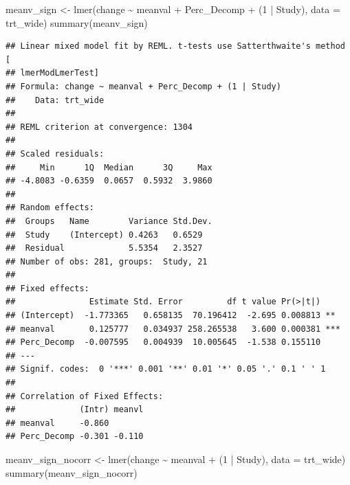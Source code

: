 \documentclass[
]{article}
\newenvironment{Shaded}{\begin{snugshade}}{\end{snugshade}}
\newcommand{\AttributeTok}[1]{\textcolor[rgb]{0.77,0.63,0.00}{#1}}
\newcommand{\DecValTok}[1]{\textcolor[rgb]{0.00,0.00,0.81}{#1}}
\newcommand{\FunctionTok}[1]{\textcolor[rgb]{0.00,0.00,0.00}{#1}}
\newcommand{\NormalTok}[1]{#1}
\newcommand{\OtherTok}[1]{\textcolor[rgb]{0.56,0.35,0.01}{#1}}
\newcommand{\SpecialCharTok}[1]{\textcolor[rgb]{0.00,0.00,0.00}{#1}}
\begin{document}
\begin{Shaded}
\begin{Highlighting}[]
\NormalTok{meanv\_sign }\OtherTok{\textless{}{-}} \FunctionTok{lmer}\NormalTok{(change }\SpecialCharTok{\textasciitilde{}}\NormalTok{ meanval }\SpecialCharTok{+}\NormalTok{ Perc\_Decomp }\SpecialCharTok{+}\NormalTok{ (}\DecValTok{1} \SpecialCharTok{|}\NormalTok{ Study), }\AttributeTok{data =}\NormalTok{ trt\_wide)}
\FunctionTok{summary}\NormalTok{(meanv\_sign)}
\end{Highlighting}
\end{Shaded}

\begin{verbatim}
## Linear mixed model fit by REML. t-tests use Satterthwaite's method [
## lmerModLmerTest]
## Formula: change ~ meanval + Perc_Decomp + (1 | Study)
##    Data: trt_wide
## 
## REML criterion at convergence: 1304
## 
## Scaled residuals: 
##     Min      1Q  Median      3Q     Max 
## -4.8083 -0.6359  0.0657  0.5932  3.9860 
## 
## Random effects:
##  Groups   Name        Variance Std.Dev.
##  Study    (Intercept) 0.4263   0.6529  
##  Residual             5.5354   2.3527  
## Number of obs: 281, groups:  Study, 21
## 
## Fixed effects:
##               Estimate Std. Error         df t value Pr(>|t|)    
## (Intercept)  -1.773365   0.658135  70.196412  -2.695 0.008813 ** 
## meanval       0.125777   0.034937 258.265538   3.600 0.000381 ***
## Perc_Decomp  -0.007595   0.004939  10.005645  -1.538 0.155110    
## ---
## Signif. codes:  0 '***' 0.001 '**' 0.01 '*' 0.05 '.' 0.1 ' ' 1
## 
## Correlation of Fixed Effects:
##             (Intr) meanvl
## meanval     -0.860       
## Perc_Decomp -0.301 -0.110
\end{verbatim}

\begin{Shaded}
\begin{Highlighting}[]
\NormalTok{meanv\_sign\_nocorr }\OtherTok{\textless{}{-}} \FunctionTok{lmer}\NormalTok{(change }\SpecialCharTok{\textasciitilde{}}\NormalTok{ meanval }\SpecialCharTok{+}\NormalTok{ (}\DecValTok{1} \SpecialCharTok{|}\NormalTok{ Study), }\AttributeTok{data =}\NormalTok{ trt\_wide)}
\FunctionTok{summary}\NormalTok{(meanv\_sign\_nocorr)}
\end{Highlighting}
\end{Shaded}
\end{document}
